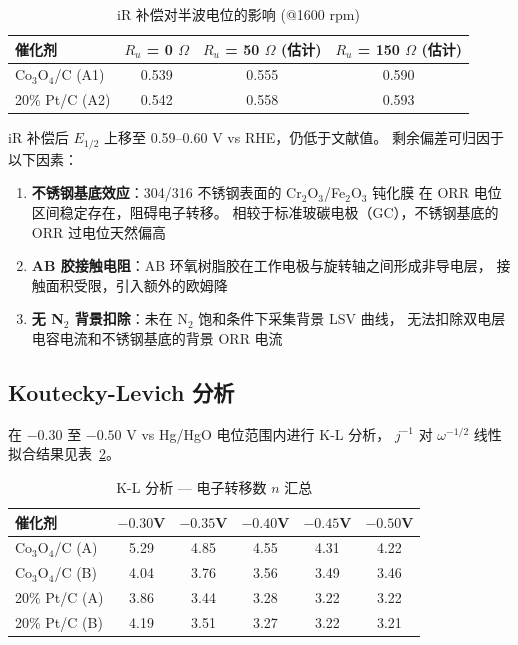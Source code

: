 \documentclass[12pt,a4paper]{ctexart}
\begin{document}
\begin{table}[h]
\centering
\caption{iR 补偿对半波电位的影响 (@1600 rpm)}
\begin{tabular}{lccc}
\toprule
催化剂 & $R_u$ = 0 $\Omega$ & $R_u$ = 50 $\Omega$ (估计) & $R_u$ = 150 $\Omega$ (估计) \\
\midrule
Co$_3$O$_4$/C (A1) & 0.539 & 0.555 & 0.590 \\
20\% Pt/C (A2)    & 0.542 & 0.558 & 0.593 \\
\bottomrule
\end{tabular}
\label{tab:ir}
\end{table}

iR 补偿后 $E_{1/2}$ 上移至 0.59--0.60 V vs RHE，仍低于文献值。
剩余偏差可归因于以下因素：

\begin{enumerate}[leftmargin=1.5cm]
  \item \textbf{不锈钢基底效应}：304/316 不锈钢表面的 Cr$_2$O$_3$/Fe$_2$O$_3$ 钝化膜
  在 ORR 电位区间稳定存在，阻碍电子转移\cite{kim1999}。
  相较于标准玻碳电极（GC），不锈钢基底的 ORR 过电位天然偏高
  \item \textbf{AB 胶接触电阻}：AB 环氧树脂胶在工作电极与旋转轴之间形成非导电层，
  接触面积受限，引入额外的欧姆降
  \item \textbf{无 N$_2$ 背景扣除}：未在 N$_2$ 饱和条件下采集背景 LSV 曲线，
  无法扣除双电层电容电流和不锈钢基底的背景 ORR 电流
\end{enumerate}

\subsection{Koutecky-Levich 分析}

在 $-0.30$ 至 $-0.50$ V vs Hg/HgO 电位范围内进行 K-L 分析，
$j^{-1}$ 对 $\omega^{-1/2}$ 线性拟合结果见表~\ref{tab:kl_summary}。

\begin{table}[h]
\centering
\caption{K-L 分析 — 电子转移数 $n$ 汇总}
\begin{tabular}{lccccc}
\toprule
催化剂 & $-0.30$V & $-0.35$V & $-0.40$V & $-0.45$V & $-0.50$V \\
\midrule
Co$_3$O$_4$/C (A) & 5.29 & 4.85 & 4.55 & 4.31 & 4.22 \\
Co$_3$O$_4$/C (B) & 4.04 & 3.76 & 3.56 & 3.49 & 3.46 \\
20\% Pt/C (A)    & 3.86 & 3.44 & 3.28 & 3.22 & 3.22 \\
20\% Pt/C (B)    & 4.19 & 3.51 & 3.27 & 3.22 & 3.21 \\
\bottomrule
\end{tabular}
\label{tab:kl_summary}
\end{table}
\end{document}
